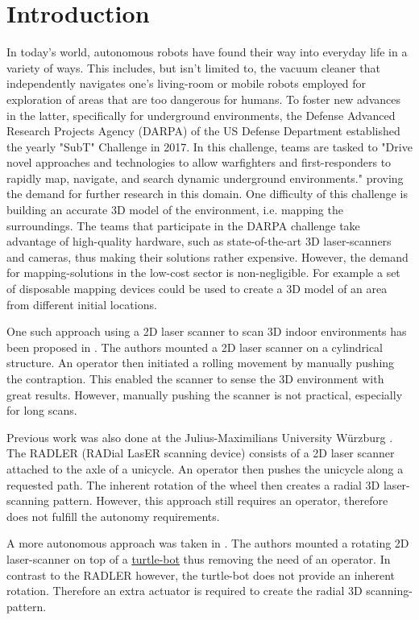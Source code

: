 \section{Introduction}
\label{sec:introduction}

In today's world, autonomous robots have found their way into everyday life in a variety of ways. This includes, but isn't limited to, the vacuum cleaner that independently navigates one's living-room or mobile robots employed for exploration of areas that are too dangerous for humans. To foster new advances in the latter, specifically for underground environments, the  Defense Advanced Research Projects Agency (DARPA) of the US Defense Department established the yearly "SubT" Challenge in 2017. In this challenge, teams are tasked to "Drive novel approaches and technologies to allow warfighters and first-responders to rapidly map, navigate, and search dynamic underground environments."  \cite{allen} proving the demand for further research in this domain. One difficulty of this challenge is building an accurate 3D model of the environment, i.e. mapping the surroundings. The teams that participate in the DARPA challenge take advantage of high-quality hardware, such as state-of-the-art 3D laser-scanners and cameras, thus making their solutions rather expensive. However, the demand for mapping-solutions in the low-cost sector is non-negligible. For example a set of disposable mapping devices could be used to create a 3D model of an area from different initial locations.

One such approach using a 2D laser scanner to scan 3D indoor environments has been proposed in  \cite{classical_mechanics_scanner}. The authors mounted a 2D laser scanner on a cylindrical structure. An operator then initiated a rolling movement by manually pushing the contraption. This enabled the scanner to sense the 3D environment with great results. However, manually pushing the scanner is not practical, especially for long scans.

Previous work was also done at the Julius-Maximilians University W\"urzburg \cite{ISER2018}. The RADLER (RADial LasER scanning device) consists of a 2D laser scanner attached to the axle of a unicycle. An operator then pushes the unicycle along a requested path. The inherent rotation of the wheel then creates a radial 3D laser-scanning pattern. However, this approach still requires an operator, therefore does not fulfill the autonomy requirements. 

A more autonomous approach was taken in \cite{3D_per_2D_based}. The authors mounted a rotating 2D laser-scanner on top of a \href{https://www.turtlebot.com}{turtle-bot} thus removing the need of an operator. In contrast to the RADLER however, the turtle-bot does not provide an inherent rotation. Therefore an extra actuator is required to create the radial 3D scanning-pattern. 

